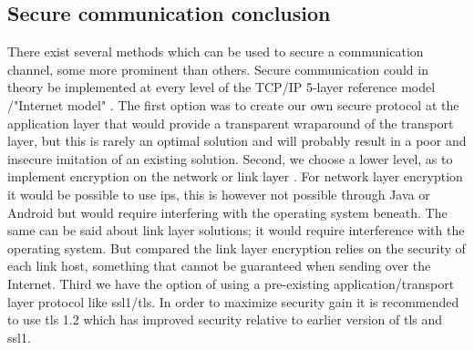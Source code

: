 \subsection{Secure communication conclusion}
There exist several methods which can be used to secure a communication channel, some more prominent than others. Secure communication could in theory be implemented at every level of the TCP/IP 5-layer reference model \cite{bib:cn}/"Internet model" \cite{bib:rfc1122}. The first option was to create our own secure protocol at the application layer that would provide a transparent wraparound of the transport layer, but this is rarely an optimal solution and will probably result in a poor and insecure imitation of an existing solution.
\newline
\newline
Second, we choose a lower level, as to implement encryption on the network or link layer \cite{bib:techtarget}. For network layer encryption it would be possible to use \gls{ips}, this is however not possible through Java or Android \cite{bib:ispec} but would require interfering with the operating system beneath.  The same can be said about link layer solutions; it would require interference with the operating system. But compared the link layer encryption relies on the security of each link host, something that cannot be guaranteed when sending over the Internet.
\newline
\newline
Third we have the option of using a pre-existing application/transport layer protocol like \gls{ssl1}/\gls{tls}. In order to maximize security gain it is recommended to use \gls{tls} 1.2 \cite{bib:ssl}  which has improved security relative to earlier version of \gls{tls} and \gls{ssl1}.

